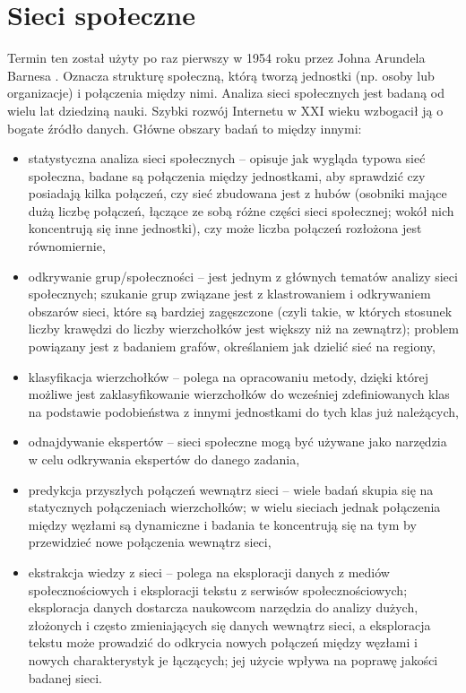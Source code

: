 \section{Sieci społeczne}
Termin ten został użyty po raz pierwszy w 1954 roku przez Johna Arundela Barnesa
\cite{JABarnes}. Oznacza strukturę społeczną, którą tworzą jednostki (np. osoby
lub organizacje) i połączenia między nimi.
Analiza sieci społecznych jest badaną od wielu lat dziedziną nauki. Szybki
rozwój Internetu w XXI wieku wzbogacił ją o bogate źródło danych. Główne obszary
badań \cite{SNDAtopics} to między innymi:
\begin{itemize}
  \item statystyczna analiza sieci społecznych -- opisuje jak wygląda typowa sieć społeczna,
  badane są połączenia między jednostkami, aby sprawdzić czy posiadają kilka połączeń,
  czy sieć zbudowana jest z hubów (osobniki mające dużą liczbę połączeń, 
  łączące ze sobą różne części sieci społecznej; wokół nich koncentrują się inne
  jednostki), czy może liczba połączeń rozłożona jest równomiernie,
  
  \item odkrywanie grup/społeczności -- jest jednym z głównych tematów analizy 
  sieci społecznych; szukanie grup związane jest z klastrowaniem i odkrywaniem 
  obszarów sieci, które są bardziej zagęszczone (czyli takie, w których
  stosunek liczby krawędzi do liczby wierzchołków jest większy niż na zewnątrz);
  problem powiązany jest z badaniem grafów, określaniem jak dzielić sieć na regiony,
  
  \item klasyfikacja wierzchołków -- polega na opracowaniu metody, dzięki której
  możliwe jest zaklasyfikowanie wierzchołków do wcześniej zdefiniowanych klas na
  podstawie podobieństwa z innymi jednostkami do tych klas już należących,
  
  \item odnajdywanie ekspertów -- sieci społeczne mogą być używane jako narzędzia
  w celu odkrywania ekspertów do danego zadania,
  
  \item predykcja przyszłych połączeń wewnątrz sieci -- wiele badań skupia
  się na statycznych połączeniach wierzchołków; w wielu sieciach jednak 
  połączenia między węzłami są dynamiczne i badania te koncentrują się na 
  tym by przewidzieć nowe połączenia wewnątrz sieci,
  
  \item ekstrakcja wiedzy z sieci -- polega na eksploracji danych z mediów 
  społecznościowych i eksploracji tekstu z serwisów społecznościowych; 
  eksploracja danych dostarcza naukowcom narzędzia do analizy dużych, 
  złożonych i często zmieniających się danych wewnątrz sieci, a eksploracja tekstu
  może prowadzić do odkrycia nowych połączeń między węzłami i nowych
  charakterystyk je łączących; jej użycie wpływa na poprawę jakości
  badanej sieci. 
\end{itemize}



